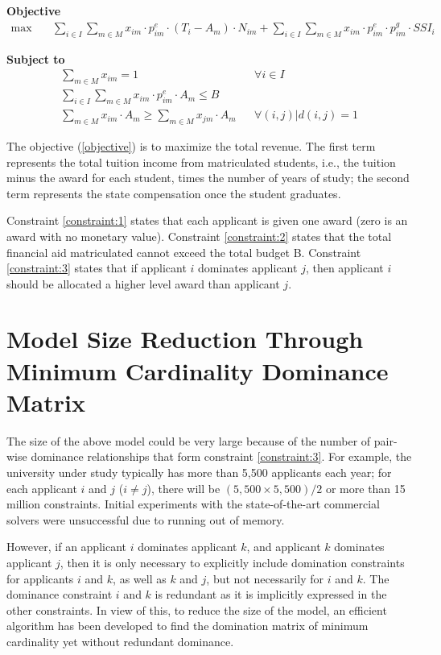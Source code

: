 \documentclass[12pt,english]{report}
\begin{document}
\hspace{-0.5cm}\textbf{Objective}
\begin{align}
\max \quad
& \sum_{i\in I} \sum_{m\in M} x_{im}\cdot p^e_{im}\cdot(T_i-A_m)\cdot N_{im}+
\sum_{i\in I} \sum_{m\in M} x_{im}\cdot p^e_{im} \cdot p^g_{im}\cdot SSI_i
\label{objective}
\end{align}

\hspace{-0.55cm}\textbf{Subject to}
\begin{align}
\sum_{m \in M}x_{im}=1 &&	\forall i\in I \label{constraint:1}  \\
\sum_{i \in I} \sum_{m\in M} x_{im}\cdot p^e_{im}\cdot A_m\leq B
\label{constraint:2}  \\
\sum_{m \in M} x_{im}\cdot A_m \geq \sum_{m \in M} x_{jm}\cdot A_m && \forall
(i,j)|d(i,j)=1 \label{constraint:3}
\end{align}

The objective (\ref{objective}) is to maximize the total revenue. The first
term represents
the total tuition income from matriculated students, i.e., the tuition minus
the award for 
each student, times the number of years of study; the second term represents
the state 
compensation once the student graduates.

Constraint \ref{constraint:1}  states that each applicant is given one award
(zero is an 
award with no monetary value). Constraint \ref{constraint:2} states that the
total financial
aid matriculated cannot exceed the total budget B. Constraint 
\ref{constraint:3} states
that if applicant $i$ dominates applicant $j$, then applicant $i$ should be
allocated a 
higher level award than applicant $j$.

\section{ Model Size Reduction Through Minimum Cardinality Dominance Matrix}

\noindent The size of the above model could be very large because of the number
of pair-wise
dominance relationships that form constraint \ref{constraint:3}. For example,
the university
under study typically has more than 5,500 applicants each year; for each
applicant $i$ and
$j$ ($i \neq j$), there will be $(5,500 \times 5,500) / 2$ or more than 15
million constraints.
Initial experiments with the state-of-the-art commercial solvers were
unsuccessful due to 
running out of memory.

However, if an applicant $i$ dominates applicant $k$, and applicant $k$
dominates applicant
$j$, then it is only necessary to explicitly include domination constraints for
applicants 
$i$ and $k$, as well as $k$ and $j$, but not necessarily for $i$ and $k$. The
dominance constraint
$i$ and $k$ is redundant as it is implicitly expressed in the other
constraints.  In view 
of this, to reduce the size of the model, an efficient algorithm has been
developed to find
the domination matrix of minimum cardinality yet without redundant dominance.
\end{document}

